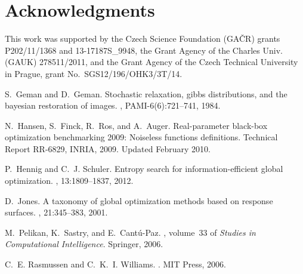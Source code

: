 \documentclass{sig-alternate}
\begin{document}


\section{Acknowledgments}

This work was supported by 
the Czech Science Foundation (GA\v{C}R) grants \hbox{P202/11/1368} and \hbox{13-17187S\_9948},
the Grant Agency of the Charles Univ.\,(GAUK) 278511/2011, 
and
the Grant Agency of the Czech Technical University in Prague, grant No.~\hbox{SGS12/196/OHK3/3T/14}.

%

\begin{thebibliography}{1}

S.~Geman and D.~Geman.
\newblock Stochastic relaxation, gibbs distributions, and the bayesian
  restoration of images.
,
  PAMI-6(6):721--741, 1984.

N.~Hansen, S.~Finck, R.~Ros, and A.~Auger.
\newblock Real-parameter black-box optimization benchmarking 2009: Noiseless
  functions definitions.
\newblock Technical Report RR-6829, INRIA, 2009.
\newblock Updated February 2010.

P.~Hennig and C.~J. Schuler.
\newblock Entropy search for information-efficient global optimization.
, 13:1809--1837, 2012.

D.~Jones.
\newblock A taxonomy of global optimization methods based on response surfaces.
, 21:345--383, 2001.

M.~Pelikan, K.~Sastry, and E.~Cant\'{u}-Paz.
, volume~33 of
  {\em Studies in Computational Intelligence}.
\newblock Springer, 2006.

C.~E. Rasmussen and C.~K.~I. Williams.
.
\newblock MIT Press, 2006.


\end{thebibliography}
%
%
\end{document}
